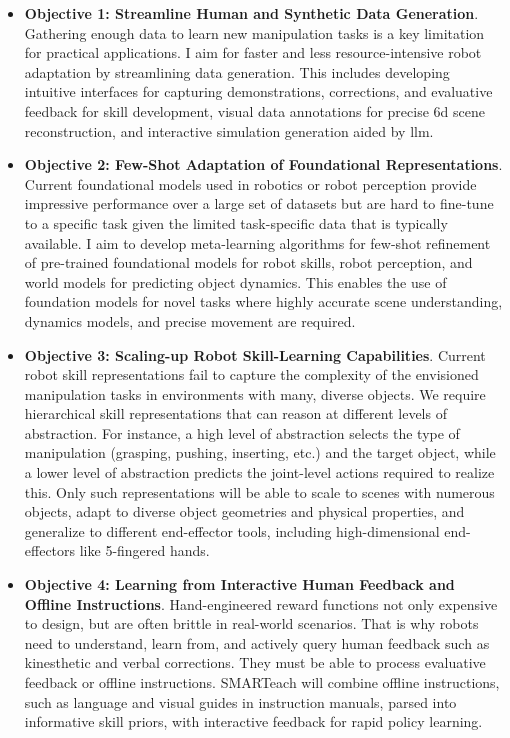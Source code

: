 \documentclass{erc-B2}
\begin{document}
\begin{itemize}[leftmargin=*]
    \item \textbf{Objective 1: Streamline Human and Synthetic Data Generation}. Gathering enough data to learn new manipulation tasks is a key limitation for practical applications. I aim for faster and less resource-intensive robot adaptation by streamlining data generation. This includes developing intuitive interfaces for capturing demonstrations, corrections, and evaluative feedback for skill development, visual data annotations for precise \gls*{6d} scene reconstruction, and interactive simulation generation aided by \gls*{llm}.
    
    \item \textbf{Objective 2: Few-Shot Adaptation of Foundational Representations}. Current foundational models used in robotics \cite{rt12022arxiv,rtx2023arxiv} or robot perception \cite{SAM} provide impressive performance over a large set of datasets but are hard to fine-tune to a specific task given the limited task-specific data that is typically available. I aim to develop meta-learning algorithms for few-shot refinement of pre-trained foundational models for robot skills, robot perception, and world models for predicting object dynamics. This enables the use of foundation models for novel tasks where highly accurate scene understanding, dynamics models, and precise movement are required.

    \item \textbf{Objective 3: Scaling-up Robot Skill-Learning Capabilities}. Current robot skill representations fail to capture the complexity of the envisioned manipulation tasks in environments with many, diverse objects. We require hierarchical skill representations that can reason at different levels of abstraction. For instance, a high level of abstraction selects the type of manipulation (grasping, pushing, inserting, etc.) and the target object, while a lower level of abstraction predicts the joint-level actions required to realize this. Only such representations will be able to scale to scenes with numerous objects, adapt to diverse object geometries and physical properties, and generalize to different end-effector tools, including high-dimensional end-effectors like 5-fingered hands.

    \item \textbf{Objective 4: Learning from Interactive Human Feedback and Offline Instructions}. Hand-engineered reward functions not only expensive to design, but are often brittle in real-world scenarios. That is why robots need to understand, learn from, and actively query human feedback such as kinesthetic and verbal corrections. They must be able to process evaluative feedback or offline instructions. SMARTeach will combine offline instructions, such as language and visual guides in instruction manuals, parsed into informative skill priors, with interactive feedback for rapid policy learning. 
\end{itemize}
\end{document}
